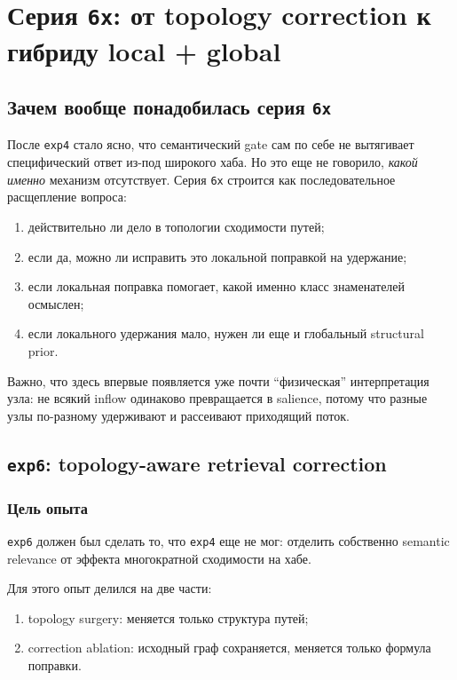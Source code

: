 \chapter{Серия \texttt{6x}: от topology correction к гибриду local + global}

\section{Зачем вообще понадобилась серия \texttt{6x}}

После \texttt{exp4} стало ясно, что семантический gate сам по себе не вытягивает
специфический ответ из-под широкого хаба. Но это еще не говорило, \emph{какой
именно} механизм отсутствует. Серия \texttt{6x} строится как последовательное
расщепление вопроса:

\begin{enumerate}[leftmargin=2em]
\item действительно ли дело в топологии сходимости путей;
\item если да, можно ли исправить это локальной поправкой на удержание;
\item если локальная поправка помогает, какой именно класс знаменателей
осмыслен;
\item если локального удержания мало, нужен ли еще и глобальный structural
prior.
\end{enumerate}

Важно, что здесь впервые появляется уже почти ``физическая'' интерпретация
узла: не всякий inflow одинаково превращается в salience, потому что разные узлы
по-разному удерживают и рассеивают приходящий поток.

\section{\texttt{exp6}: topology-aware retrieval correction}

\subsection{Цель опыта}

\texttt{exp6} должен был сделать то, что \texttt{exp4} еще не мог: отделить
собственно semantic relevance от эффекта многократной сходимости на хабе.

Для этого опыт делился на две части:

\begin{enumerate}[leftmargin=2em]
\item topology surgery: меняется только структура путей;
\item correction ablation: исходный граф сохраняется, меняется только формула
поправки.
\end{enumerate}

